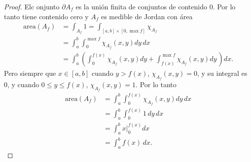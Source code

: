 \begin{proof}
    Elc onjunto 
    \( \partial A_f \) es la unión finita de conjuntos de contenido 0. Por lo tanto tiene 
    contenido cero y \( A_f \) es medible de Jordan con área
    \begin{align*}
        \mathrm{area}(A_f)
        &=
        \int_{A_f}
        1
        =
        \int_{[a,b]\times [0, \max{f}]}
        \chi_{A_f}\\
        &=
        \int_{a}^b
        \int_{0}^{\max f}
        \chi_{A_f}(x,y) dy\,dx\\
        &=
        \int_{a}^b
        \left(
        \int_{0}^{f(x)}
        \chi_{A_f}(x,y) 
        dy
        +
        \int_{f(x)}^{\max f}
        \chi_{A_f}(x,y)
        dy\,
        \right)
        dx.
    \end{align*}
    Pero siempre que \( x\in [a,b] \) 
    cuando $y> f(x)$, $\chi_{A_f}(x,y)=0$, y su integral es 0, y cuando 
    \( 0 \leq y \leq f(x) \), \( \chi_{A_f}(x,y)=1 \). Por lo tanto
    \begin{align*}
        \mathrm{area}(A_f)
        &=
        \int_{a}^b
        \int_{0}^{f(x)}
        \chi_{A_f}(x,y) 
        dy
        \,
        dx\\
        &=
        \int_{a}^b
        \int_{0}^{f(x)}
        1\,
        dy
        \,
        dx\\
        &=
        \int_a^b
        x
        {\rvert_0^{f(x)}}
        dx\\
        &=
        \int_a^b
        f(x)
        \,
        dx.
    \end{align*}
\end{proof}
